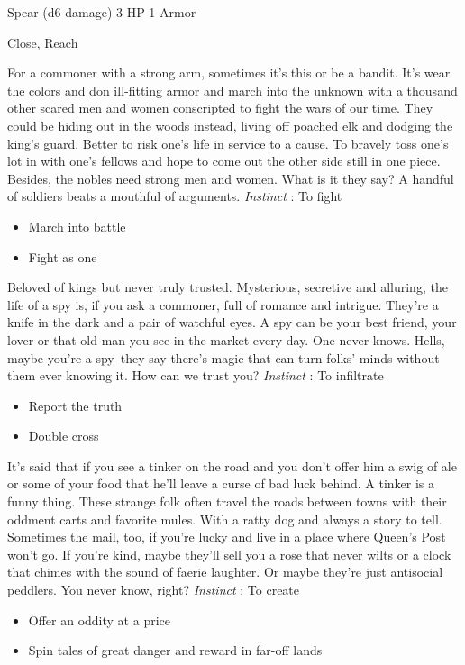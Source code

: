 

 Spear (d6 damage) 3 HP 1 Armor


 Close, Reach


 For a commoner with a strong arm, sometimes it's this or be a bandit. It's wear the colors and don ill-fitting armor and march into the unknown with a thousand other scared men and women conscripted to fight the wars of our time. They could be hiding out in the woods instead, living off poached elk and dodging the king's guard. Better to risk one's life in service to a cause. To bravely toss one's lot in with one's fellows and hope to come out the other side still in one piece. Besides, the nobles need strong men and women. What is it they say? A handful of soldiers beats a mouthful of arguments. \emph{Instinct}
: To fight
\begin{itemize}
\item March into battle
\item Fight as one

\end{itemize}




 Beloved of kings but never truly trusted. Mysterious, secretive and alluring, the life of a spy is, if you ask a commoner, full of romance and intrigue. They're a knife in the dark and a pair of watchful eyes. A spy can be your best friend, your lover or that old man you see in the market every day. One never knows. Hells, maybe you're a spy--they say there's magic that can turn folks' minds without them ever knowing it. How can we trust you? \emph{Instinct}
: To infiltrate
\begin{itemize}
\item Report the truth
\item Double cross

\end{itemize}




 It's said that if you see a tinker on the road and you don't offer him a swig of ale or some of your food that he'll leave a curse of bad luck behind. A tinker is a funny thing. These strange folk often travel the roads between towns with their oddment carts and favorite mules. With a ratty dog and always a story to tell. Sometimes the mail, too, if you're lucky and live in a place where Queen's Post won't go. If you're kind, maybe they'll sell you a rose that never wilts or a clock that chimes with the sound of faerie laughter. Or maybe they're just antisocial peddlers. You never know, right? \emph{Instinct}
: To create
\begin{itemize}
\item Offer an oddity at a price
\item Spin tales of great danger and reward in far-off lands

\end{itemize}


